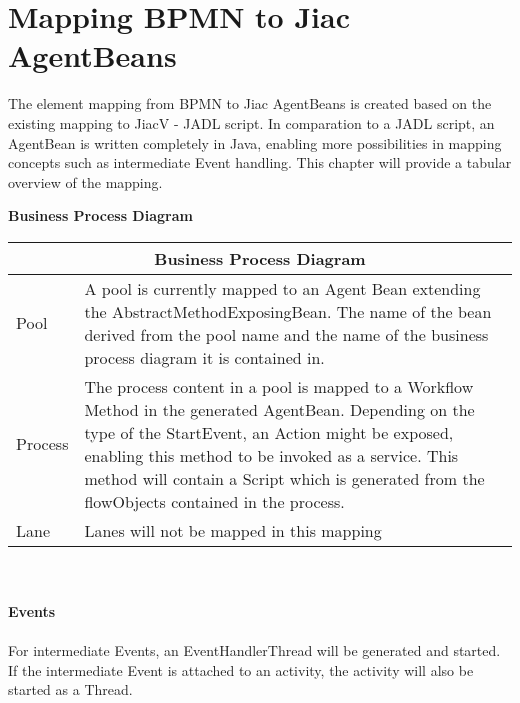 \chapter{Mapping BPMN to Jiac AgentBeans}
\label{chap:mapping}

The element mapping from BPMN to Jiac AgentBeans is created based on the existing mapping to JiacV - JADL script. In comparation to a JADL script, an AgentBean is written completely in Java, enabling more possibilities in mapping concepts such as intermediate Event handling. This chapter will provide a tabular overview of the mapping. 

\textbf{\large{Business Process Diagram}}

		\begin{tabularx}{\linewidth}{|l|X|}\hline\hline
			\multicolumn{2}{|c|}{\textbf{Business Process Diagram}} \\\hline\hline
			 Pool & A pool is currently mapped to an Agent Bean extending the AbstractMethodExposingBean. The name of the bean derived from the pool name and the name of the business process diagram it is contained in.\\\hline
			 Process & The process content in a pool is mapped to a Workflow Method in the generated AgentBean. Depending on the type of the StartEvent, an Action might be exposed, enabling this method to be invoked as a service. This method will contain a Script which is generated from the flowObjects contained in the process.\\\hline
			 Lane & Lanes will not be mapped in this mapping\\\hline \hline
		\end{tabularx}\\\\

				
				
\textbf{\Large{Events}}\\\\
For intermediate Events, an EventHandlerThread will be generated and started. If the intermediate Event is attached to an activity, the activity will also be started as a Thread. 

